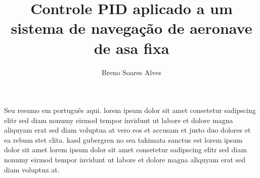 \documentclass[english,oneside]{UFFStex}
\author{Breno Soares Alves}
\title{Controle PID aplicado a um sistema de navegação de aeronave de asa fixa}
      {PID control applied to fixed-wing aircraft navigation system}
\begin{document}
\fichacatalografica










\begin{resumo}
Seu resumo em português aqui. lorem ipsum dolor sit amet
consetetur sadipscing elitr sed diam nonumy eirmod tempor invidunt
ut labore et dolore magna aliquyam erat sed diam voluptua at vero
eos et accusam et justo duo dolores et ea rebum stet clita.  kasd
gubergren no sea takimata sanctus est lorem ipsum dolor sit amet
lorem ipsum dolor sit amet consetetur sadipscing elitr sed diam
nonumy eirmod tempor invidunt ut labore et dolore magna aliquyam
erat sed diam voluptua at.
\end{resumo}
\end{document}
